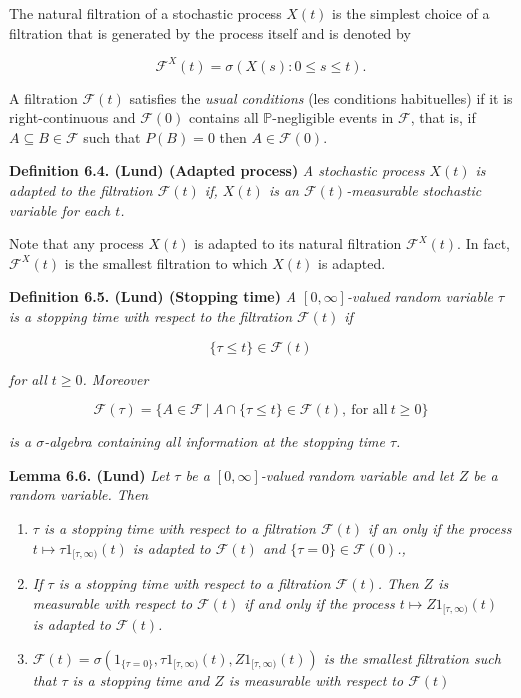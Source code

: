 \documentclass[a4paper,10pt,openany]{book}
\providecommand{\tightlist}{%
 \setlength{\itemsep}{0pt}\setlength{\parskip}{0pt}}
\begin{document}
The natural filtration of a stochastic process \(X(t)\) is the simplest choice of a filtration that is generated by the process itself and is denoted by

\[
\mathcal F^X(t) = \sigma (X(s) : 0 \le  s \le t).
\]

A filtration \(\mathcal F(t)\) satisfies the \emph{usual conditions} (les conditions habituelles) if it is right-continuous and \(\mathcal F(0)\) contains all \(\mathbb P\)-negligible events in \(\mathcal F\), that is, if \(A \subseteq B \in \mathcal F\) such that \(P(B) = 0\) then \(A \in\mathcal F(0)\).

\textbf{Definition 6.4. (Lund) (Adapted process)} \emph{A stochastic process \(X(t)\) is adapted to the filtration \(\mathcal F(t)\) if, \(X(t)\) is an \(\mathcal F(t)\)-measurable stochastic variable for each \(t\).}

Note that any process \(X(t)\) is adapted to its natural filtration \(\mathcal F^X(t)\). In fact, \(\mathcal F^X(t)\) is the smallest filtration to which \(X(t)\) is adapted.

\textbf{Definition 6.5. (Lund) (Stopping time)} \emph{A \([0,\infty]\)-valued random variable \(\tau\) is a stopping time with respect to the filtration \(\mathcal F(t)\) if}

\[
\{\tau\le t\}\in \mathcal F(t)
\]

\emph{for all \(t\ge 0\). Moreover}

\[
\mathcal F(\tau)=\{A\in\mathcal F\ \vert\ A\cap \{\tau\le t\}\in\mathcal F(t),\ \text{for all}\ t\ge 0\}
\]

\emph{is a \(\sigma\)-algebra containing all information at the stopping time \(\tau\).}

\textbf{Lemma 6.6. (Lund)} \emph{Let \(\tau\) be a \([0,\infty]\)-valued random variable and let \(Z\) be a random variable. Then}

\begin{enumerate}
\def\labelenumi{(\roman{enumi})}
\tightlist
\item
  \emph{\(\tau\) is a stopping time with respect to a filtration \(\mathcal F(t)\) if an only if the process \(t\mapsto \tau 1_{[\tau,\infty)}(t)\) is adapted to \(\mathcal F(t)\) and \(\{\tau = 0\}\in\mathcal F(0)\).,}
\item
  \emph{If \(\tau\) is a stopping time with respect to a filtration \(\mathcal F(t)\). Then \(Z\) is measurable with respect to \(\mathcal F(t)\) if and only if the process \(t\mapsto Z1_{[\tau,\infty)}(t)\) is adapted to \(\mathcal F(t)\).}
\item
  \emph{\(\mathcal F(t)=\sigma(1_{\{\tau = 0\}},\tau 1_{[\tau,\infty)}(t),Z1_{[\tau,\infty)}(t))\) is the smallest filtration such that \(\tau\) is a stopping time and \(Z\) is measurable with respect to \(\mathcal F(t)\)}
\end{enumerate}
\end{document}
